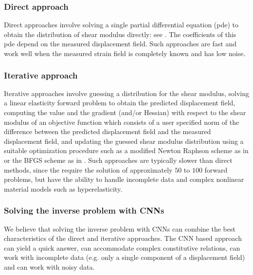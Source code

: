 \documentclass[12pt]{article}
\begin{document}
\subsubsection{Direct approach} Direct approaches involve solving a single partial differential equation (pde) to obtain the distribution of shear modulus directly: see \cite{paper:raghavan1994,paper:barboneadjwt,paper:albocher}. The coefficients of this pde depend on the measured displacement field. Such approaches are fast and work well when the measured strain field is completely known and has low noise.
\subsubsection{Iterative approach} Iterative approaches \cite{paper:oberai2003,paper:gokhale2008,paper:kalle1996,paper:doyley,paper:goenezen2011} involve guessing a distribution for the shear modulus, solving a linear elasticity forward problem to obtain the predicted displacement field, computing the value and the gradient (and/or Hessian) with respect to the shear modulus of an objective function which consists of a user specified norm of the difference between the predicted displacement field and the measured displacement field, and updating the guessed shear modulus distribution using a suitable optimization procedure such as a modified Newton Raphson scheme as in \cite{paper:doyley} or the BFGS scheme as in \cite{paper:gokhale2008,paper:goenezen2011}. Such approaches are typically slower than direct methods, since the require the solution of approximately $50$ to $100$ forward problems, but have the ability to handle incomplete data and complex nonlinear material models such as hyperelasticity.
\subsubsection{Solving the inverse problem with CNNs}
We believe that solving the inverse problem with CNNs can combine the best characteristics of the direct and iterative approaches. The CNN based approach can yield a quick answer, can accommodate complex constitutive relations, can work with incomplete data (e.g. only a single component of a displacement field) and can work with noisy data.
\end{document}
